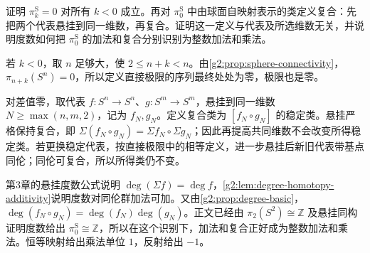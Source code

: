 \begin{exercise}\label{g2:ex:stable-degree-ring}
	证明 \(\pi_k^{\mathrm S}=0\) 对所有 \(k<0\) 成立。再对 \(\pi_0^{\mathrm S}\) 中由球面自映射表示的类定义复合：先把两个代表悬挂到同一维数，再复合。证明这一定义与代表及所选维数无关，并说明度数如何把 \(\pi_0^{\mathrm S}\) 的加法和复合分别识别为整数加法和乘法。
\end{exercise}
\begin{solution}
	若 \(k<0\)，取 \(n\) 足够大，使 \(2\le n+k<n\)。由\cref{g2:prop:sphere-connectivity}，\(\pi_{n+k}(S^n)=0\)，所以定义直接极限的序列最终处处为零，极限也是零。

	对差值零，取代表 \(f:S^n\rightarrow S^n\)、\(g:S^m\rightarrow S^m\)，悬挂到同一维数 \(N\ge\max(n,m,2)\)，记为 \(f_N,g_N\)。定义复合类为 \([f_N\circ g_N]\) 的稳定类。悬挂严格保持复合，即 \(\Sigma(f_N\circ g_N)=\Sigma f_N\circ\Sigma g_N\)；因此再提高共同维数不会改变所得稳定类。若更换稳定代表，按直接极限中的相等定义，进一步悬挂后新旧代表带基点同伦；同伦可复合，所以所得类仍不变。

	第3章的悬挂度数公式说明 \(\deg(\Sigma f)=\deg f\)，\cref{g2:lem:degree-homotopy-additivity}说明度数对同伦群加法可加。又由\cref{g2:prop:degree-basic}，\(\deg(f_N\circ g_N)=\deg(f_N)\deg(g_N)\)。正文已经由 \(\pi_2(S^2)\cong\mathbb Z\) 及悬挂同构证明度数给出 \(\pi_0^{\mathrm S}\cong\mathbb Z\)，所以在这个识别下，加法和复合正好成为整数加法和乘法。恒等映射给出乘法单位 \(1\)，反射给出 \(-1\)。
\end{solution}
